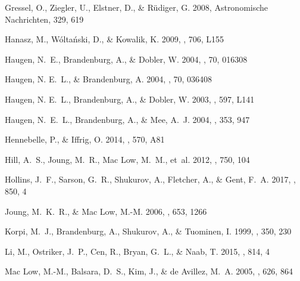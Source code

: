\documentclass[preprint2]{aastex63}
\begin{document}
{\begin{thebibliography}{}
{Gressel}, O., {Ziegler}, U., {Elstner}, D., \& {R{\"u}diger}, G. 2008,
 Astronomische Nachrichten, 329, 619

{Hanasz}, M., {W{\'o}lta{\'n}ski}, D., \& {Kowalik}, K. 2009, \apjl, 706, L155

{Haugen}, N.~E., {Brandenburg}, A., \& {Dobler}, W. 2004{}, \pre,
 70, 016308

{Haugen}, N. E.~L., \& {Brandenburg}, A. 2004, \pre, 70, 036408

{Haugen}, N. E.~L., {Brandenburg}, A., \& {Dobler}, W. 2003, \apjl, 597, L141

{Haugen}, N.~E.~L., {Brandenburg}, A., \& {Mee}, A.~J. 2004{},
 \mnras, 353, 947

{Hennebelle}, P., \& {Iffrig}, O. 2014, \aap, 570, A81

{Hill}, A.~S., {Joung}, M.~R., {Mac Low}, M.~M., {et~al.} 2012, \apj, 750, 104

{Hollins}, J.~F., {Sarson}, G.~R., {Shukurov}, A., {Fletcher}, A., \& {Gent},
 F.~A. 2017, \apj, 850, 4

{Joung}, M.~K.~R., \& {Mac Low}, M.-M. 2006, \apj, 653, 1266

{Korpi}, M.~J., {Brandenburg}, A., {Shukurov}, A., \& {Tuominen}, I. 1999,
 \aap, 350, 230

{Li}, M., {Ostriker}, J.~P., {Cen}, R., {Bryan}, G.~L., \& {Naab}, T. 2015,
 \apj, 814, 4

{Mac Low}, M.-M., {Balsara}, D.~S., {Kim}, J., \& {de Avillez}, M.~A. 2005,
 \apj, 626, 864


\end{thebibliography}}
\end{document}
